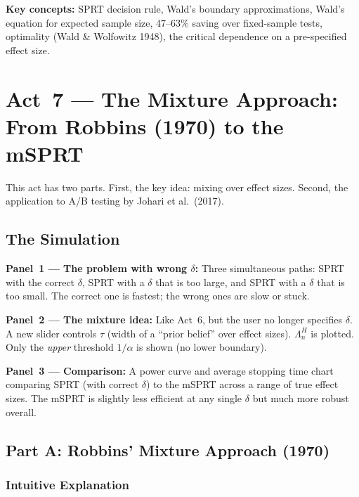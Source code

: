 \documentclass[12pt, a4paper]{article}
\newcommand{\LR}{\Lambda}              %
\begin{document}
\begin{keytakeaway}
\textbf{Key concepts:} SPRT decision rule, Wald's boundary approximations,
Wald's equation for expected sample size, 47--63\% saving over fixed-sample
tests, optimality (Wald \& Wolfowitz 1948), the critical dependence on a
pre-specified effect size.
\end{keytakeaway}


\newpage
\section{Act~7 --- The Mixture Approach: From Robbins (1970) to the mSPRT}

This act has two parts.  First, the key idea: mixing over effect sizes.
Second, the application to A/B testing by Johari et al.\ (2017).

\subsection{The Simulation}

\begin{simulation}
\textbf{Panel~1 --- The problem with wrong $\delta$:}
Three simultaneous paths: SPRT with the correct $\delta$, SPRT with a
$\delta$ that is too large, and SPRT with a $\delta$ that is too small.
The correct one is fastest; the wrong ones are slow or stuck.

\textbf{Panel~2 --- The mixture idea:}
Like Act~6, but the user no longer specifies $\delta$.  A new slider
controls $\tau$ (width of a ``prior belief'' over effect sizes).
$\LR_n^{H}$ is plotted.  Only the \emph{upper} threshold $1/\alpha$ is
shown (no lower boundary).

\textbf{Panel~3 --- Comparison:}
A power curve and average stopping time chart comparing SPRT (with correct
$\delta$) to the mSPRT across a range of true effect sizes.  The mSPRT is
slightly less efficient at any single $\delta$ but much more robust overall.
\end{simulation}

\subsection{Part A: Robbins' Mixture Approach (1970)}

\subsubsection*{Intuitive Explanation}
\end{document}
